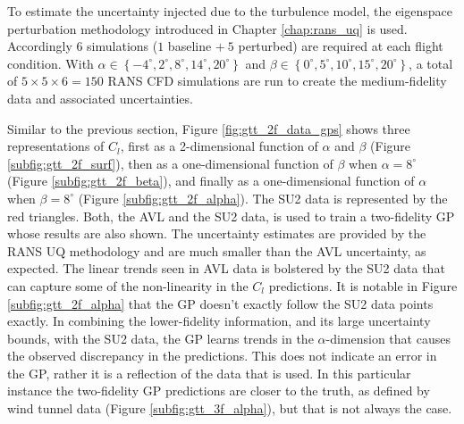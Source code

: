 To estimate the uncertainty injected due to the turbulence model, the eigenspace perturbation methodology introduced in Chapter \ref{chap:rans_uq} is used. 
Accordingly $6$ simulations ($1$ baseline $+~5$ perturbed) are required at each flight condition. 
With $\alpha \in \left \{ -4^\circ,2^\circ,8^\circ,14^\circ,20^\circ \right \}$ and $\beta \in \left \{ 0^\circ,5^\circ,10^\circ,15^\circ,20^\circ \right \}$, a total of $5\times5\times6 = 150$ RANS CFD simulations are run to create the medium-fidelity data and associated uncertainties. 

Similar to the previous section, Figure \ref{fig:gtt_2f_data_gps} shows three representations of $C_l$, first as a 2-dimensional function of $\alpha$ and $\beta$ (Figure \ref{subfig:gtt_2f_surf}), then as a one-dimensional function of $\beta$ when $\alpha=8^\circ$ (Figure \ref{subfig:gtt_2f_beta}), and finally as a one-dimensional function of $\alpha$ when $\beta = 8^\circ$ (Figure \ref{subfig:gtt_2f_alpha}).
The SU2 data is represented by the red triangles. 
Both, the AVL and the SU2 data, is used to train a two-fidelity GP whose results are also shown. 
The uncertainty estimates are provided by the RANS UQ methodology and are much smaller than the AVL uncertainty, as expected. 
The linear trends seen in AVL data is bolstered by the SU2 data that can capture some of the non-linearity in the $C_l$ predictions. 
It is notable in Figure \ref{subfig:gtt_2f_alpha} that the GP doesn't exactly follow the SU2 data points exactly. 
In combining the lower-fidelity information, and its large uncertainty bounds, with the SU2 data, the GP learns trends in the $\alpha$-dimension that causes the observed discrepancy in the predictions. 
This does not indicate an error in the GP, rather it is a reflection of the data that is used. 
In this particular instance the two-fidelity GP predictions are closer to the truth, as defined by wind tunnel data (Figure \ref{subfig:gtt_3f_alpha}), but that is not always the case.

